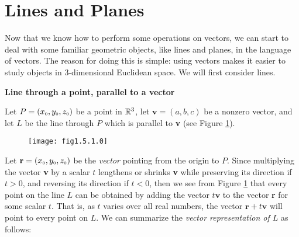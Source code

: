 \section{Lines and Planes}
Now that we know how to perform some operations on vectors, we can start to deal with some familiar geometric objects,
like lines and planes, in the language of vectors. The reason for doing this is simple: using vectors makes it easier
to study objects in 3-dimensional Euclidean space. We will first consider lines.\vspace{4mm}

\par\noindent\textbf{\large{Line through a point, parallel to a vector}}\normalsize\vspace{2mm}

Let $P = (x_{\scriptscriptstyle 0},y_{\scriptscriptstyle 0},z_{\scriptscriptstyle 0})$ be a point in $\mathbb{R}^{3}$, let $\textbf{v} = (a,b,c)$ be a nonzero
vector, and let $L$ be the line through $P$ which is parallel to \textbf{v} (see Figure \ref{fig:linepvec}).

\begin{figure}[h]
 \begin{center}
  \texttt{[image: fig1.5.1.0]}
 \end{center}\vspace{-5mm}
 \caption[]{}
 \label{fig:linepvec}
\end{figure}

Let $\textbf{r} = (x_{\scriptscriptstyle 0},y_{\scriptscriptstyle 0},z_{\scriptscriptstyle 0})$ be the \emph{vector} pointing from the origin to $P$. Since
multiplying the vector \textbf{v} by a scalar $t$ lengthens or shrinks \textbf{v} while preserving its direction
if $t > 0$, and reversing its direction if $t < 0$, then we see from Figure \ref{fig:linepvec} that every point on the
line $L$ can be obtained by adding the vector $t \textbf{v}$ to the vector \textbf{r} for some scalar $t$. That is, as
$t$ varies over all real numbers, the vector $\textbf{r} + t \textbf{v}$ will point to every point on $L$. We can
summarize the \emph{vector representation of $L$} as follows:\vspace{1mm}

